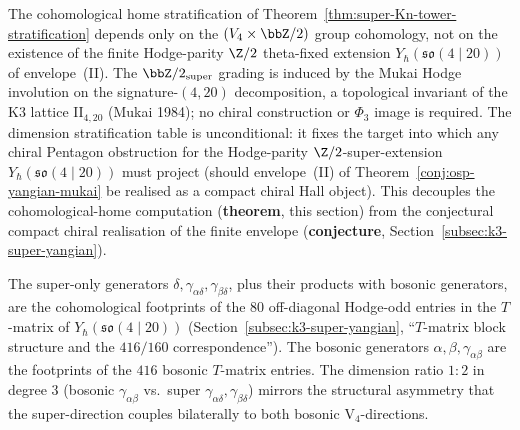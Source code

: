 \begin{remark}
\label{rem:super-stratification-CYA3-independent}
The cohomological home stratification of
Theorem~\ref{thm:super-Kn-tower-stratification} depends only on the
$(V_4 \times \bbZ/2)$ group cohomology, not on the existence of the
finite Hodge-parity $\Z/2$ theta-fixed extension
$Y_\hbar(\mathfrak{so}(4 \mid 20))$ of envelope~(II). The
$\bbZ/2_{\mathrm{super}}$ grading is induced by the Mukai Hodge
involution on the signature-$(4, 20)$ decomposition, a topological
invariant of the K$3$ lattice $\mathrm{II}_{4,20}$ \textup{(}Mukai
1984\textup{);} no chiral construction or $\Phi_3$ image is required. The dimension
stratification table is unconditional: it fixes the target
into which any chiral Pentagon obstruction for the Hodge-parity
$\Z/2$-super-extension $Y_\hbar(\mathfrak{so}(4 \mid 20))$ must
project \textup{(}should envelope~(II) of
Theorem~\ref{conj:osp-yangian-mukai} be realised as a compact chiral
Hall object\textup{).} This decouples the cohomological-home
computation \textup{(}\textbf{theorem}, this section\textup{)} from
the conjectural compact chiral realisation of the finite envelope
\textup{(}\textbf{conjecture}, Section~\ref{subsec:k3-super-yangian}\textup{).}
\end{remark}

\begin{remark}
\label{rem:super-only-generators-416-160}
The super-only generators
$\delta, \gamma_{\alpha\delta}, \gamma_{\beta\delta}$, plus their
products with bosonic generators, are the cohomological footprints of
the $80$ off-diagonal Hodge-odd entries in the $T$-matrix of $Y_\hbar(\mathfrak{so}(4 \mid 20))$
\textup{(}Section~\ref{subsec:k3-super-yangian},
``$T$-matrix block structure and the $416/160$ correspondence''\textup{).}
The bosonic generators $\alpha, \beta, \gamma_{\alpha\beta}$ are the
footprints of the $416$ bosonic $T$-matrix entries. The dimension
ratio $1 : 2$ in degree $3$ \textup{(}bosonic $\gamma_{\alpha\beta}$
vs.\ super $\gamma_{\alpha\delta}, \gamma_{\beta\delta}$\textup{)}
mirrors the structural asymmetry that the super-direction couples
bilaterally to both bosonic V$_4$-directions.
\end{remark}



